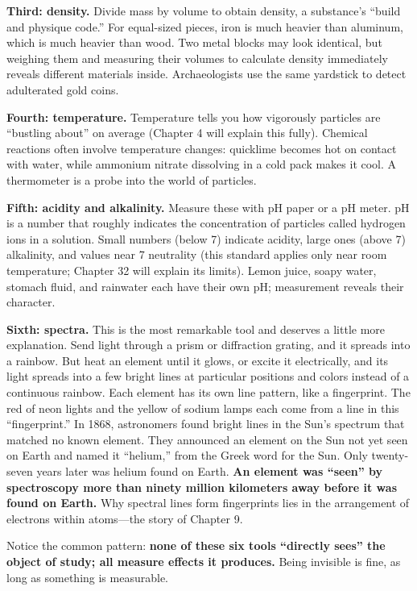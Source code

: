 \textbf{Third: density.} Divide mass by volume to obtain density, a substance's ``build and physique code.'' For equal-sized pieces, iron is much heavier than aluminum, which is much heavier than wood. Two metal blocks may look identical, but weighing them and measuring their volumes to calculate density immediately reveals different materials inside. Archaeologists use the same yardstick to detect adulterated gold coins.

\textbf{Fourth: temperature.} Temperature tells you how vigorously particles are ``bustling about'' on average (Chapter 4 will explain this fully). Chemical reactions often involve temperature changes: quicklime becomes hot on contact with water, while ammonium nitrate dissolving in a cold pack makes it cool. A thermometer is a probe into the world of particles.

\textbf{Fifth: acidity and alkalinity.} Measure these with pH paper or a pH meter. pH is a number that roughly indicates the concentration of particles called hydrogen ions in a solution. Small numbers (below 7) indicate acidity, large ones (above 7) alkalinity, and values near 7 neutrality (this standard applies only near room temperature; Chapter 32 will explain its limits). Lemon juice, soapy water, stomach fluid, and rainwater each have their own pH; measurement reveals their character.

\textbf{Sixth: spectra.} This is the most remarkable tool and deserves a little more explanation. Send light through a prism or diffraction grating, and it spreads into a rainbow. But heat an element until it glows, or excite it electrically, and its light spreads into a few bright lines at particular positions and colors instead of a continuous rainbow. Each element has its own line pattern, like a fingerprint. The red of neon lights and the yellow of sodium lamps each come from a line in this ``fingerprint.'' In 1868, astronomers found bright lines in the Sun's spectrum that matched no known element. They announced an element on the Sun not yet seen on Earth and named it ``helium,'' from the Greek word for the Sun. Only twenty-seven years later was helium found on Earth. \textbf{An element was ``seen'' by spectroscopy more than ninety million kilometers away before it was found on Earth.} Why spectral lines form fingerprints lies in the arrangement of electrons within atoms---the story of Chapter 9.

Notice the common pattern: \textbf{none of these six tools ``directly sees'' the object of study; all measure effects it produces.} Being invisible is fine, as long as something is measurable.

